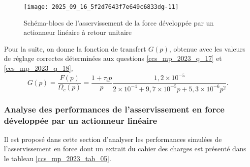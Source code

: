 

\begin{figure}[!h]
\centering
\texttt{[image: 2025\_09\_16\_5f2d7643f7e649c6833dg-11]}
\caption{\label{ccs_mp_2023_fig_15} Schéma-blocs de l'asservissement de la force développée par un actionneur linéaire à retour unitaire}
\end{figure}

\ifprof
\begin{corrige}
\end{corrige}
\else
\fi



\ifprof
\begin{corrige}
\end{corrige}
\else
\fi


Pour la suite, on donne la fonction de transfert $G(p)$, obtenue avec les valeurs de réglage correctes déterminées aux questions \ref{ccs_mp_2023_q_17} et \ref{ccs_mp_2023_q_18},
$$
G(p)=\frac{F(p)}{\Omega_{c}(p)}=\frac{1+\tau_{i} p}{p} \frac{1,2 \times 10^{-5}}{2 \times 10^{-4}+9,7 \times 10^{-5} p+5,3 \times 10^{-6} p^{2}} .
$$

\subsubsection{Analyse des performances de l'asservissement en force développée par un actionneur linéaire}%
Il est proposé dans cette section d'analyser les performances simulées de l'asservissement en force dont un extrait du cahier des charges est présenté dans le tableau \ref{ccs_mp_2023_tab_05}.

